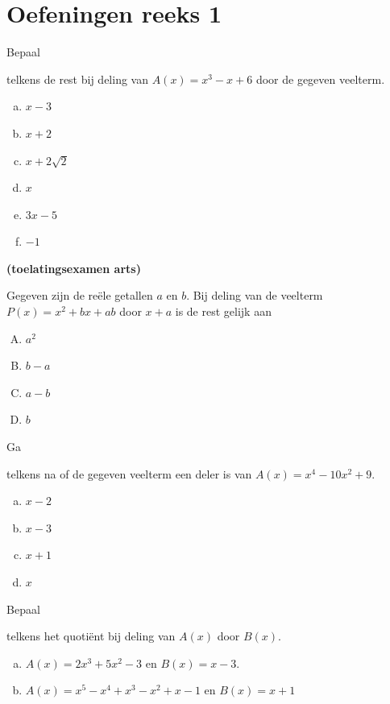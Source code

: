 \documentclass{ximera}
\begin{document}
\section*{Oefeningen reeks 1}
\begin{exercise} 
\hypertarget{oef3.1}{Bepaal} telkens de rest bij deling van $A(x) = x^3-x+6$ door de gegeven veelterm.
\begin{multicols}{2}
\begin{enumerate}[(a)]
\item
$x-3$
\item
$x+2$
\item
$x + 2\sqrt{2}$
\item
$x$
\item
$3x-5$
\item
$-1$
\end{enumerate}
\end{multicols}
\end{exercise} 

\begin{exercise} 
\hypertarget{oef3.2}{{\bf (toelatingsexamen arts)}} 
Gegeven zijn de re\"ele getallen $a$ en $b$. Bij deling van de veelterm $P(x) = x^2 + bx + ab$ door $x+a$ is de rest gelijk aan
\begin{multicols}{4}
\begin{enumerate}[(A)]
\item 
$a^2$
\item 
$b-a$ 
\item 
$a-b$ 
\item 
$b$
\end{enumerate}
\end{multicols}
\end{exercise} 

\begin{exercise} 
\hypertarget{oef3.3}{Ga} telkens na of de gegeven veelterm een deler is van $A(x) = x^4 - 10x^2 + 9$. 
\begin{multicols}{2}
\begin{enumerate}[(a)]
\item
$x-2$
\item
$x-3$
\item
$x+1$
\item
$x$
\end{enumerate}
\end{multicols}
\end{exercise} 

\begin{exercise} 
\hypertarget{oef3.4}{Bepaal} telkens het quoti\"ent bij deling van $A(x)$ door $B(x)$.%
\begin{enumerate}[(a)]
\item
$A(x) = 2x^3+5x^2-3$ \quad en \quad $B(x) = x-3$.
\item
$A(x) = x^5 - x^4 + x^3 - x^2 + x - 1$ \quad en \quad $B(x) = x+1$
\end{enumerate}
\end{exercise} 
\end{document}
